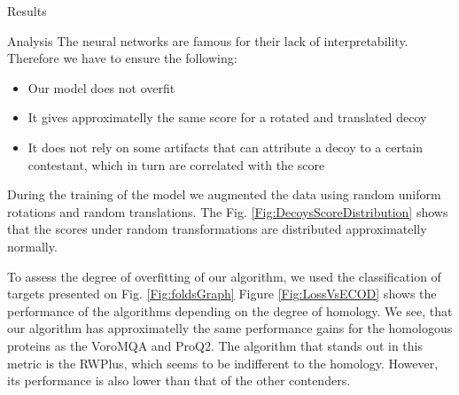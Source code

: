 \documentclass[final, unknownkeysallowed]{beamer}
\begin{document}
\begin{frame}{}
\begin{textblock}{39.0}
\begin{block}{Results}
\end{block}

\begin{block}{Analysis}
The neural networks are famous for their lack of interpretability. 
Therefore we have to ensure the following:
\begin{itemize}
\item Our model does not overfit 
\item It gives approximatelly the same score for a rotated and translated decoy 
\item It does not rely on some artifacts that can attribute a decoy to a certain contestant, which 
in turn are correlated with the score
\end{itemize}

During the training of the model we augmented the data using random uniform rotations and random translations. 
The Fig. \ref{Fig:DecoysScoreDistribution} shows that the scores under random transformations are distributed approximatelly normally.

To assess the degree of overfitting of our algorithm, we used the classification of targets presented on Fig. \ref{Fig:foldsGraph}
Figure \ref{Fig:LossVsECOD} shows the performance of the algorithms depending on the degree of homology. 
We see, that our algorithm has approximatelly the same performance gains for the homologous proteins as the VoroMQA and ProQ2. 
The algorithm that stands out in this metric is the RWPlus, which seems to be indifferent to the homology. 
However, its performance is also lower than that of the other contenders.


\end{block}
\end{textblock}
\end{frame}
\end{document}
